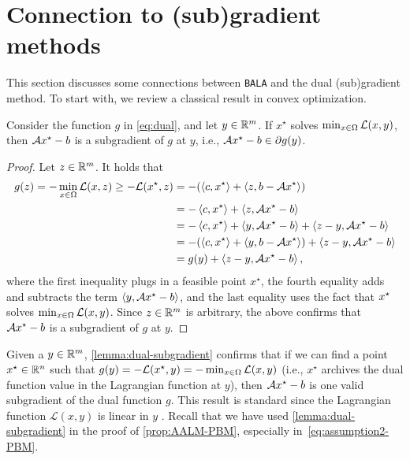 \documentclass[11pt]{article}
\newcommand{\alg}{\texttt{BALA}}%
\begin{document}
\section{Connection to (sub)gradient methods} \label{appendix:subgradient-methods}

This section discusses some connections between \alg{} and the dual (sub)gradient method. To start with, we review a classical result in convex optimization.
\begin{lemma}
    \label{lemma:dual-subgradient}
    Consider the function $g$ in \eqref{eq:dual}, and let $y \in \mathbb{R}^m$. If $x^\star$ solves $ \min_{x \in \Omega}  \mathcal{L}(x,y)$, then $\mathcal{A} x^\star -  b$ is a subgradient of $g$ at $y$, i.e., $ \mathcal{A} x^\star -  b \in \partial g(y)$.
\end{lemma}
\begin{proof}
    Let $z\in \mathbb{R}^m$. It holds that 
    \begin{equation*}
        \begin{aligned}
            g(z)  = -\min_{x\in \Omega} \mathcal{L}(x,z) \geq - \mathcal{L}(x^\star,z)         & = -(\left \langle c, x^\star \right\rangle+\left \langle z, b-\mathcal{A} x^\star \right\rangle) \\
            & = -\left \langle c, x^\star \right\rangle + \left \langle z, \mathcal{A} x^\star-b \right\rangle \\
            & = -\left \langle c, x^\star \right\rangle + \left \langle y, \mathcal{A} x^\star-b \right\rangle  +\left \langle z - y, \mathcal{A} x^\star -b \right\rangle \\
            & = -(\left \langle c, x^\star \right\rangle + \left \langle y, b-\mathcal{A} x^\star \right\rangle)  +\left \langle z - y, \mathcal{A} x^\star-b \right\rangle \\
            & = g(y) + \left \langle z - y, \mathcal{A} x^\star-b \right\rangle,
        \end{aligned}
    \end{equation*}
    where the first inequality plugs in a feasible point $x^\star$, the fourth equality adds and subtracts the term $\left \langle y, \mathcal{A} x^\star - b \right\rangle$, and the last equality uses the fact that $x^\star$ solves $\min_{x\in \Omega} \mathcal{L}(x,y)$.
    Since $z \in \mathbb{R}^m$ is arbitrary, the above confirms that $\mathcal{A} x^\star - b $ is a subgradient of $g$ at $y$.
\end{proof}

Given a $y \in \mathbb{R}^m$, \cref{lemma:dual-subgradient} confirms that if we can find a point $x^\star \in \mathbb{R}^n$ such that $  g(y) = -\mathcal{L}(x^\star,y) = -\min_{x\in \Omega}\mathcal{L}(x,y)$ (i.e., $x^\star$ archives the dual function value in the Lagrangian function at $y$), then $\mathcal{A} x^\star -  b$ is one valid subgradient of the dual function $g$. This result is standard since the Lagrangian function $\mathcal{L}(x,y)$ is linear in $y$ \cite[Chapter 4]{ruszczynski2011nonlinear}.
Recall that we have used \cref{lemma:dual-subgradient} in the proof of \cref{prop:AALM-PBM}, especially in~\cref{eq:assumption2-PBM}.  
\end{document}
